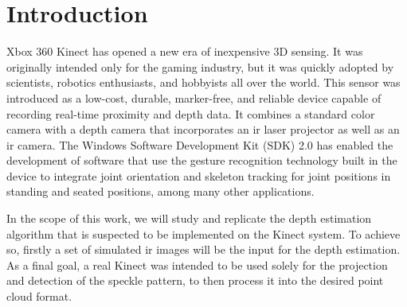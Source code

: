 \documentclass[journal]{IEEEtran}
\begin{document}
\section{Introduction}
% 
% 
% 
% 
 Xbox 360 Kinect has opened a new era of inexpensive 3D sensing. It was originally intended only for the gaming industry, but it was quickly adopted by scientists, robotics enthusiasts, and hobbyists all over the world. This sensor was introduced as a low-cost, durable, marker-free, and reliable device capable of recording real-time proximity and depth data. It combines a standard color camera with a depth camera that incorporates an \gls{ir} laser projector as well as an  \gls{ir} camera. The Windows Software Development Kit (SDK) 2.0 has enabled the development of software that use the gesture recognition technology built in the device to integrate joint orientation and skeleton tracking for joint positions in standing and seated positions, among many other applications.

In the scope of this work, we will study and replicate the depth estimation algorithm that is suspected to be implemented on the Kinect system. To achieve so, firstly a set of simulated \gls{ir} images will be the input for the depth estimation. As a final goal, a real Kinect was intended to be used solely for the projection and detection of the speckle pattern, to then process it into the desired point cloud format.



\end{document}
